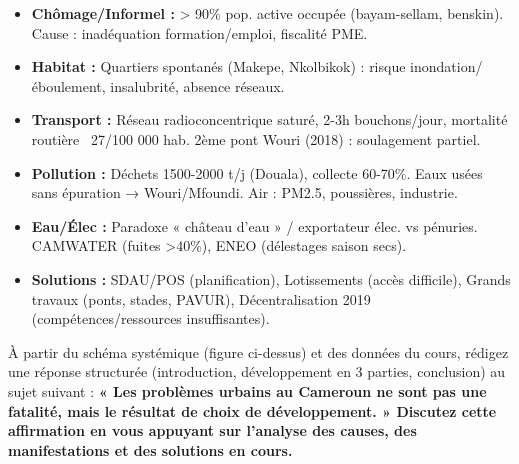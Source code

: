 \documentclass[11pt]{article}
\begin{document}
\begin{aretenir}
\begin{itemize}
    \item \textbf{Chômage/Informel :} > 90\% pop. active occupée (bayam-sellam, benskin). Cause : inadéquation formation/emploi, fiscalité PME.
    \item \textbf{Habitat :} Quartiers spontanés (Makepe, Nkolbikok) : risque inondation/éboulement, insalubrité, absence réseaux.
    \item \textbf{Transport :} Réseau radioconcentrique saturé, 2-3h bouchons/jour, mortalité routière ~27/100 000 hab. 2ème pont Wouri (2018) : soulagement partiel.
    \item \textbf{Pollution :} Déchets 1500-2000 t/j (Douala), collecte 60-70\%. Eaux usées sans épuration → Wouri/Mfoundi. Air : PM2.5, poussières, industrie.
    \item \textbf{Eau/Élec :} Paradoxe « château d'eau » / exportateur élec. vs pénuries. CAMWATER (fuites >40\%), ENEO (délestages saison secs).
    \item \textbf{Solutions :} SDAU/POS (planification), Lotissements (accès difficile), Grands travaux (ponts, stades, PAVUR), Décentralisation 2019 (compétences/ressources insuffisantes).
\end{itemize}
\end{aretenir}

\begin{exercice}
À partir du schéma systémique (figure ci-dessus) et des données du cours, rédigez une réponse structurée (introduction, développement en 3 parties, conclusion) au sujet suivant :
\textbf{« Les problèmes urbains au Cameroun ne sont pas une fatalité, mais le résultat de choix de développement. » Discutez cette affirmation en vous appuyant sur l'analyse des causes, des manifestations et des solutions en cours.}
\end{exercice}
\end{document}
